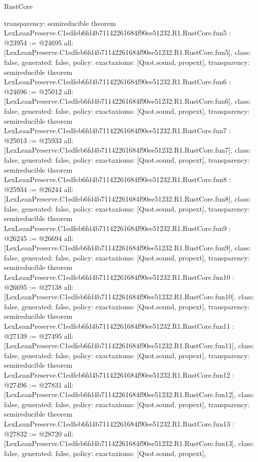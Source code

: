 \begin{lexlean}{RustCore}
\begin{coremodule}
{  transparency: semireducible
}
theorem LexLeanPreserve.C1edfeb6fd4b71142261684f90ee51232.R1.RustCore.fun5 : @23954 := @24695 {
  all: [LexLeanPreserve.C1edfeb6fd4b71142261684f90ee51232.R1.RustCore.fun5],
  class: false,
  generated: false,
  policy: exact{axioms: [Quot.sound, propext]},
  transparency: semireducible
}
theorem LexLeanPreserve.C1edfeb6fd4b71142261684f90ee51232.R1.RustCore.fun6 : @24696 := @25012 {
  all: [LexLeanPreserve.C1edfeb6fd4b71142261684f90ee51232.R1.RustCore.fun6],
  class: false,
  generated: false,
  policy: exact{axioms: [Quot.sound, propext]},
  transparency: semireducible
}
theorem LexLeanPreserve.C1edfeb6fd4b71142261684f90ee51232.R1.RustCore.fun7 : @25013 := @25933 {
  all: [LexLeanPreserve.C1edfeb6fd4b71142261684f90ee51232.R1.RustCore.fun7],
  class: false,
  generated: false,
  policy: exact{axioms: [Quot.sound, propext]},
  transparency: semireducible
}
theorem LexLeanPreserve.C1edfeb6fd4b71142261684f90ee51232.R1.RustCore.fun8 : @25934 := @26244 {
  all: [LexLeanPreserve.C1edfeb6fd4b71142261684f90ee51232.R1.RustCore.fun8],
  class: false,
  generated: false,
  policy: exact{axioms: [Quot.sound, propext]},
  transparency: semireducible
}
theorem LexLeanPreserve.C1edfeb6fd4b71142261684f90ee51232.R1.RustCore.fun9 : @26245 := @26694 {
  all: [LexLeanPreserve.C1edfeb6fd4b71142261684f90ee51232.R1.RustCore.fun9],
  class: false,
  generated: false,
  policy: exact{axioms: [Quot.sound, propext]},
  transparency: semireducible
}
theorem LexLeanPreserve.C1edfeb6fd4b71142261684f90ee51232.R1.RustCore.fun10 : @26695 := @27138 {
  all: [LexLeanPreserve.C1edfeb6fd4b71142261684f90ee51232.R1.RustCore.fun10],
  class: false,
  generated: false,
  policy: exact{axioms: [Quot.sound, propext]},
  transparency: semireducible
}
theorem LexLeanPreserve.C1edfeb6fd4b71142261684f90ee51232.R1.RustCore.fun11 : @27139 := @27495 {
  all: [LexLeanPreserve.C1edfeb6fd4b71142261684f90ee51232.R1.RustCore.fun11],
  class: false,
  generated: false,
  policy: exact{axioms: [Quot.sound, propext]},
  transparency: semireducible
}
theorem LexLeanPreserve.C1edfeb6fd4b71142261684f90ee51232.R1.RustCore.fun12 : @27496 := @27831 {
  all: [LexLeanPreserve.C1edfeb6fd4b71142261684f90ee51232.R1.RustCore.fun12],
  class: false,
  generated: false,
  policy: exact{axioms: [Quot.sound, propext]},
  transparency: semireducible
}
theorem LexLeanPreserve.C1edfeb6fd4b71142261684f90ee51232.R1.RustCore.fun13 : @27832 := @28720 {
  all: [LexLeanPreserve.C1edfeb6fd4b71142261684f90ee51232.R1.RustCore.fun13],
  class: false,
  generated: false,
  policy: exact{axioms: [Quot.sound, propext]},
}
\end{coremodule}
\end{lexlean}
